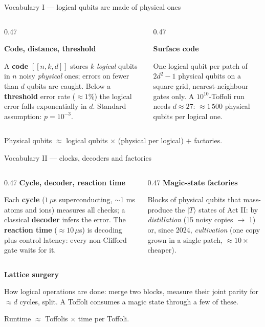 \documentclass[aspectratio=169,11pt]{beamer}
\newcommand{\blocktitle}[1]{{\bfseries #1}\par\vskip1mm}
\begin{document}
\begin{frame}{Vocabulary I --- logical qubits are made of physical ones}
  \begin{columns}[T]
    \begin{column}{0.47\textwidth}
      \begin{greyblock}
        \blocktitle{Code, distance, threshold}
        A \textbf{code} $[[n,k,d]]$ stores $k$ \emph{logical} qubits in $n$ noisy \emph{physical} ones; errors on fewer than $d$ qubits are caught. Below a \textbf{threshold} error rate ($\approx1\%$) the logical error falls exponentially in $d$. Standard assumption: $p=10^{-3}$.
      \end{greyblock}
    \end{column}
    \begin{column}{0.47\textwidth}
      \begin{greyblock}
        \blocktitle{Surface code}
        One logical qubit per patch of $2d^2-1$ physical qubits on a square grid, nearest-neighbour gates only. A $10^{10}$-Toffoli run needs $d\approx27$: $\approx1\,500$ physical qubits per logical one.
      \end{greyblock}
    \end{column}
  \end{columns}
  \begin{takeaway}Physical qubits $\approx$ logical qubits $\times$ (physical per logical) $+$ factories.\end{takeaway}
\end{frame}

\begin{frame}{Vocabulary II --- clocks, decoders and factories}
  \begin{columns}[T]
    \begin{column}{0.47\textwidth}
      \blocktitle{Cycle, decoder, reaction time}
      Each \textbf{cycle} ($1\,\mu$s superconducting, $\sim$1 ms atoms and ions) measures all checks; a classical \textbf{decoder} infers the error. The \textbf{reaction time} ($\approx10\,\mu$s) is decoding plus control latency: every non-Clifford gate waits for it.
    \end{column}
    \begin{column}{0.47\textwidth}
      \blocktitle{Magic-state factories}
      Blocks of physical qubits that mass-produce the $|T\rangle$ states of Act II: by \emph{distillation} (15 noisy copies $\to$ 1) or, since 2024, \emph{cultivation} (one copy grown in a single patch, $\approx10\times$ cheaper).
    \end{column}
  \end{columns}
  \vskip2mm
  \blocktitle{Lattice surgery}
  How logical operations are done: merge two blocks, measure their joint parity for $\approx d$ cycles, split. A Toffoli consumes a magic state through a few of these.
  \begin{takeaway}Runtime $\approx$ Toffolis $\times$ time per Toffoli.\end{takeaway}
\end{frame}
\end{document}
